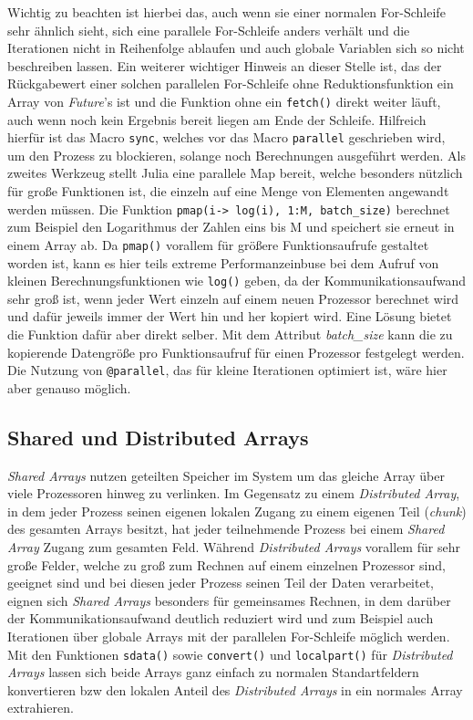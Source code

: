 \documentclass[proseminar,german,utf8]{zihpub}
\begin{document}
Wichtig zu beachten ist hierbei das, auch wenn sie einer normalen For-Schleife sehr ähnlich sieht, sich eine parallele For-Schleife anders verhält und die Iterationen nicht in Reihenfolge ablaufen und auch globale Variablen sich so nicht beschreiben lassen. Ein weiterer wichtiger Hinweis an dieser Stelle ist, das der Rückgabewert einer solchen parallelen For-Schleife ohne Reduktionsfunktion ein Array von \textit{Future}'s ist und die Funktion ohne ein \verb|fetch()| direkt weiter läuft, auch wenn noch kein Ergebnis bereit liegen am Ende der Schleife. Hilfreich hierfür ist das Macro \verb|sync|, welches vor das Macro \verb|parallel| geschrieben wird, um den Prozess zu blockieren, solange noch Berechnungen ausgeführt werden. Als zweites Werkzeug stellt Julia eine parallele Map bereit, welche besonders nützlich für große Funktionen ist, die einzeln auf eine Menge von Elementen angewandt werden müssen. Die Funktion \verb|pmap(i-> log(i), 1:M, batch_size)| berechnet zum Beispiel den Logarithmus der Zahlen eins bis M und speichert sie erneut in einem Array ab. Da \verb|pmap()| vorallem für größere Funktionsaufrufe gestaltet worden ist, kann es hier teils extreme Performanzeinbuse bei dem Aufruf von kleinen Berechnungsfunktionen wie \verb|log()| geben, da der Kommunikationsaufwand sehr groß ist, wenn jeder Wert einzeln auf einem neuen Prozessor berechnet wird und dafür jeweils immer der Wert hin und her kopiert wird. Eine Lösung bietet die Funktion dafür aber direkt selber. Mit dem Attribut \textit{batch\_size} kann die zu kopierende Datengröße pro Funktionsaufruf für einen Prozessor festgelegt werden. Die Nutzung von \verb|@parallel|, das für kleine Iterationen optimiert ist, wäre hier aber genauso möglich.~\cite{JuliaLangDocumentation}

\subsection{Shared und Distributed Arrays}

\textit{Shared Arrays} nutzen geteilten Speicher im System um das gleiche Array über viele Prozessoren hinweg zu verlinken. Im Gegensatz zu einem \textit{Distributed Array}, in dem jeder Prozess seinen eigenen lokalen Zugang zu einem eigenen Teil (\textit{chunk}) des gesamten Arrays besitzt, hat jeder teilnehmende Prozess bei einem \textit{Shared Array} Zugang zum gesamten Feld. Während \textit{Distributed Arrays} vorallem für sehr große Felder, welche zu groß zum Rechnen auf einem einzelnen Prozessor sind, geeignet sind und bei diesen jeder Prozess seinen Teil der Daten verarbeitet, eignen sich \textit{Shared Arrays} besonders für gemeinsames Rechnen, in dem darüber der Kommunikationsaufwand deutlich reduziert wird und zum Beispiel auch Iterationen über globale Arrays mit der parallelen For-Schleife möglich werden. Mit den Funktionen \verb|sdata()| sowie \verb|convert()| und \verb|localpart()| für \textit{Distributed Arrays} lassen sich beide Arrays ganz einfach zu normalen Standartfeldern konvertieren bzw den lokalen Anteil des\textit{ Distributed Arrays} in ein normales Array extrahieren. ~\cite{JuliaLangDocumentation}
\end{document}
